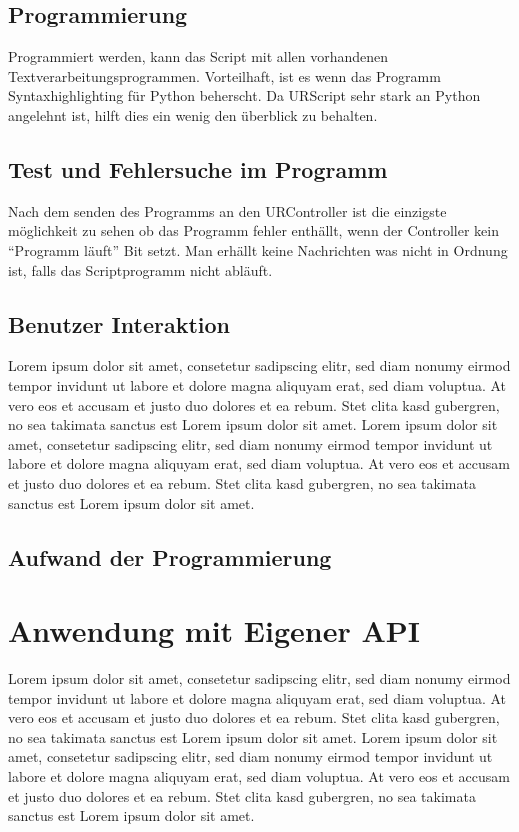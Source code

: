 \subsection{Programmierung}
\label{programmierung_ur_script_rel}

Programmiert werden, kann das Script mit allen vorhandenen Textverarbeitungsprogrammen. Vorteilhaft, ist es wenn das Programm Syntaxhighlighting für Python beherscht. Da URScript sehr stark an Python angelehnt ist, hilft dies ein wenig den überblick zu behalten.

\subsection{Test und Fehlersuche im Programm}
\label{ur_script_debuggen}

Nach dem senden des Programms an den URController ist die einzigste möglichkeit zu sehen ob das Programm fehler enthällt, wenn der Controller kein ``Programm läuft'' Bit setzt. Man erhällt keine Nachrichten was nicht in Ordnung ist, falls das Scriptprogramm nicht abläuft.

\subsection{Benutzer Interaktion}
\label{ur_script_user_interaction}
Lorem ipsum dolor sit amet, consetetur sadipscing elitr, sed diam nonumy eirmod tempor invidunt ut labore et dolore magna aliquyam erat, sed diam voluptua. At vero eos et accusam et justo duo dolores et ea rebum. Stet clita kasd gubergren, no sea takimata sanctus est Lorem ipsum dolor sit amet. Lorem ipsum dolor sit amet, consetetur sadipscing elitr, sed diam nonumy eirmod tempor invidunt ut labore et dolore magna aliquyam erat, sed diam voluptua. At vero eos et accusam et justo duo dolores et ea rebum. Stet clita kasd gubergren, no sea takimata sanctus est Lorem ipsum dolor sit amet.

\subsection{Aufwand der Programmierung}
\label{ur_script_aufwand}

\section{Anwendung mit Eigener API}
\label{sec:script_hoerherer_schicht_rel}
Lorem ipsum dolor sit amet, consetetur sadipscing elitr, sed diam nonumy eirmod tempor invidunt ut labore et dolore magna aliquyam erat, sed diam voluptua. At vero eos et accusam et justo duo dolores et ea rebum. Stet clita kasd gubergren, no sea takimata sanctus est Lorem ipsum dolor sit amet. Lorem ipsum dolor sit amet, consetetur sadipscing elitr, sed diam nonumy eirmod tempor invidunt ut labore et dolore magna aliquyam erat, sed diam voluptua. At vero eos et accusam et justo duo dolores et ea rebum. Stet clita kasd gubergren, no sea takimata sanctus est Lorem ipsum dolor sit amet.

